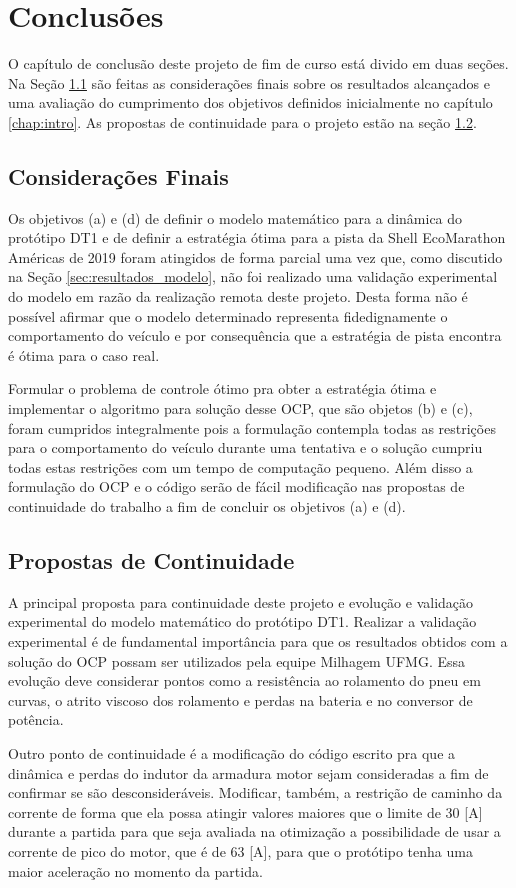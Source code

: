 \chapter{Conclusões}
\label{chap:conclusao}

O capítulo de conclusão deste projeto de fim de curso está divido em duas seções.
Na Seção \ref{sec:5_1} são feitas as considerações finais sobre os resultados alcançados e uma avaliação do cumprimento dos objetivos definidos inicialmente no capítulo \ref{chap:intro}.
As propostas de continuidade para o projeto estão na seção \ref{sec:5_2}.

\section{Considerações Finais}
\label{sec:5_1}

Os objetivos (a) e (d) de definir o modelo matemático para a dinâmica do protótipo DT1 e de definir a estratégia ótima para a pista da Shell EcoMarathon Américas de 2019 
foram atingidos de forma parcial uma vez que, como discutido na Seção \ref{sec:resultados_modelo}, não foi realizado uma validação experimental do modelo em razão da 
realização remota deste projeto. Desta forma não é possível afirmar que o modelo determinado representa fidedignamente o comportamento do veículo
e por consequência que a estratégia de pista encontra é ótima para o caso real.

Formular o problema de controle ótimo pra obter a estratégia ótima e implementar o algoritmo para solução desse OCP,
que são objetos (b) e (c), foram cumpridos integralmente pois a formulação contempla todas as restrições para o comportamento do veículo durante uma tentativa e o solução cumpriu todas estas
restrições com um tempo de computação pequeno. Além disso a formulação do OCP e o código serão de fácil modificação nas propostas de continuidade do trabalho
a fim de concluir os objetivos (a) e (d).

\section{Propostas de Continuidade}
\label{sec:5_2}

A principal proposta para continuidade deste projeto e evolução e validação experimental do modelo matemático do protótipo DT1.
Realizar a validação experimental é de fundamental importância para que os resultados obtidos com a solução do OCP possam ser utilizados pela equipe Milhagem UFMG.
Essa evolução deve considerar pontos como a resistência ao rolamento do pneu em curvas, o atrito viscoso dos rolamento e perdas na bateria e no conversor de potência.

Outro ponto de continuidade é a modificação do código escrito pra que a dinâmica e perdas do indutor da armadura motor sejam consideradas a fim de confirmar
se são desconsideráveis.  
Modificar, também, a restrição de caminho da corrente de forma que ela possa atingir valores maiores que o limite de $30$ [A] durante a partida para que 
seja avaliada na otimização a possibilidade de usar a corrente de pico do motor, que é de $63$ [A], para que o protótipo tenha
uma maior aceleração no momento da partida. 

\clearpage
